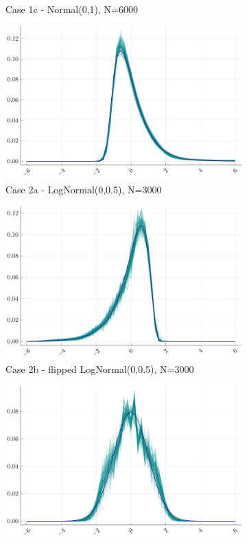 \begin{figure}[H]
\begin{subfigure}[t]{.4\textwidth}
		\caption{Case 1c - Normal(0,1), N=6000} 
	\end{subfigure}
	\begin{subfigure}[t]{.4\textwidth}
		\centering
		\includegraphics[width=\linewidth]{Figures/2a/W.pdf}
		\caption{Case 2a - LogNormal(0,0.5), N=3000} 
	\end{subfigure}
	\vspace{20px}
	\begin{subfigure}[t]{.4\textwidth}
		\centering
		\includegraphics[width=\linewidth]{Figures/2b/W.pdf}
		\caption{Case 2b - flipped LogNormal(0,0.5), N=3000} 
	\end{subfigure}
	\begin{subfigure}[t]{.4\textwidth}
		\centering
		\includegraphics[width=\linewidth]{Figures/3/W.pdf}

\end{subfigure}
\end{figure}

